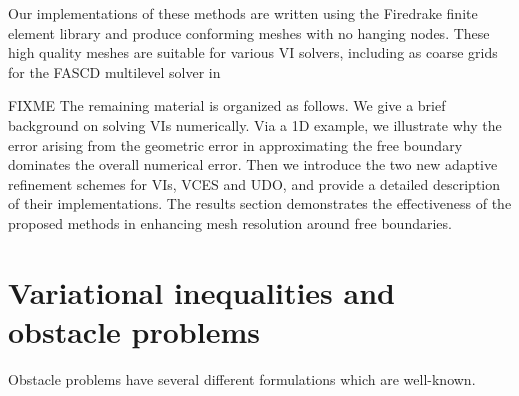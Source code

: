 \documentclass[]{interact}
\theoremstyle{plain}%
\theoremstyle{definition}
\theoremstyle{remark}
\begin{document}
Our implementations of these methods are written using the Firedrake finite element library and produce conforming meshes with no hanging nodes. These high quality meshes are suitable for various VI solvers, including as coarse grids for the FASCD multilevel solver in \cite{BuelerFarrell2024}

FIXME The remaining material is organized as follows.  We give a brief background on solving VIs numerically.  Via a 1D example, we illustrate why the error arising from the geometric error in approximating the free boundary dominates the overall numerical error.   Then we introduce the two new adaptive refinement schemes for VIs, VCES and UDO, and provide a detailed description of their implementations.  The results section demonstrates the effectiveness of the proposed methods in enhancing mesh resolution around free boundaries. 


\section{Variational inequalities and obstacle problems} \label{sec:vi}

Obstacle problems have several different formulations which are well-known.
\end{document}
